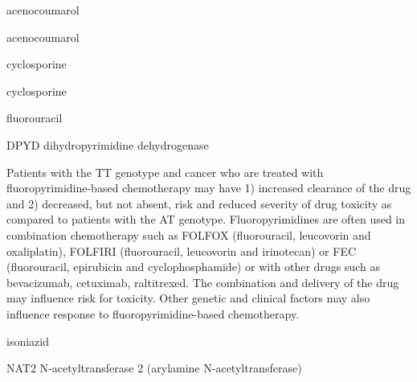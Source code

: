 \documentclass{resume} %
\begin{document}
\begin{rSection}{ acenocoumarol }
\begin{rSection}{ acenocoumarol }
\begin{rSection}{ cyclosporine }
\begin{rSection}{ cyclosporine }
\begin{rSection}{ fluorouracil }
\begin{rSubsection}{ DPYD }{ dihydropyrimidine dehydrogenase }{}{}
\item[] Patients with the TT genotype and cancer who are treated with fluoropyrimidine-based chemotherapy may have 1) increased clearance of the drug and 2) decreased, but not absent, risk and reduced severity of drug toxicity as compared to patients with the AT genotype. Fluoropyrimidines are often used in combination chemotherapy such as FOLFOX (fluorouracil, leucovorin and oxaliplatin), FOLFIRI (fluorouracil, leucovorin and irinotecan) or FEC (fluorouracil, epirubicin and cyclophosphamide) or with other drugs such as bevacizumab, cetuximab, raltitrexed. The combination and delivery of the drug may influence risk for toxicity. Other genetic and clinical factors may also influence response to fluoropyrimidine-based chemotherapy.

\end{rSubsection}

\end{rSection}
\begin{rSection}{ isoniazid }
\item[]
\begin{rSubsection}{ NAT2 }{ N-acetyltransferase 2 (arylamine N-acetyltransferase) }{}{}
\item[]


\end{rSubsection}


\end{rSection}
\end{rSection}
\end{rSection}
\end{rSection}
\end{rSection}
\end{document}
